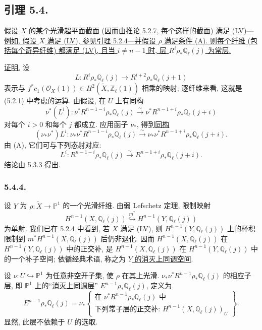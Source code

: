 \subsection*{引理 5.4.}
\underline{假设 $X$ 的某个光滑超平面截面 (因而由推论 5.2.7, 每个这样的截面) 满足 (LV)---例如, 假设 $X$ 满足 (LV), 参见引理 5.2.4---并假设 $\rho$ 满足条件 (A). 则每个纤维 (包括每个奇异纤维) 都满足 (LV), 且当 $i\neq n-1$ 时, 层 $R^i\rho_*\mathbb Q_\ell(j)$ 为常层.}

\underline{证明.}
设
\[
L:R^i\rho_*\mathbb Q_\ell(j)
\longrightarrow R^{i+2}\rho_*\mathbb Q_\ell(j+1)
\]
表示与 $f^*c_1(\mathcal O_X(1))\in H^2(\widetilde X,\mathbb Z_\ell(1))$ 相乘的映射; 逐纤维来看, 这就是 (5.2.1) 中考虑的运算. 由假设, 在 $U$ 上有同构
\begin{equation}\tag{5.4.1}
\nu^*(L^i):
\nu^*R^{n-1-i}\rho_*\mathbb Q_\ell(j)
\overset{\sim}{\longrightarrow}
\nu^*R^{n-1+i}\rho_*\mathbb Q_\ell(j+i)
\end{equation}
对每个 $i>0$ 和每个 $j$ 都成立. 应用函子 $\nu_*$, 得到\underline{同构}
\begin{equation}\tag{5.4.2}
(\nu_*\nu^*)L^i:
\nu_*\nu^*R^{n-1-i}\rho_*\mathbb Q_\ell(j)
\overset{\sim}{\longrightarrow}
\nu_*\nu^*R^{n-1+i}\rho_*\mathbb Q_\ell(j+i).
\end{equation}
由 (A), 它们可与下列态射对应:
\begin{equation}\tag{5.4.3}
L^i:R^{n-1-i}\rho_*\mathbb Q_\ell(j)
\overset{\sim}{\longrightarrow}
R^{n-1+i}\rho_*\mathbb Q_\ell(j+i).
\end{equation}
结论由 5.3.3 得出.

\subsubsection*{5.4.4.}
设 $Y$ 为 $\rho:\widetilde X\to\mathbb P^1$ 的一个光滑纤维. 由弱 Lefschetz 定理, 限制映射
\[
H^{n-1}(X,\mathbb Q_\ell(j))
\overset{m^*}{\hookrightarrow}
H^{n-1}(Y,\mathbb Q_\ell(j))
\]
为单射. 我们已在 5.2.4 中看到, 若 $X$ 满足 (LV), 则 $H^{n-1}(Y,\mathbb Q_\ell(j))$ 上的杯积限制到 $m^*H^{n-1}(X,\mathbb Q_\ell(j))$ 后仍非退化. 因而 $H^{n-1}(X,\mathbb Q_\ell(j))$ 在 $H^{n-1}(Y,\mathbb Q_\ell(j))$ 中的正交补, 是 $H^{n-1}(X,\mathbb Q_\ell(j))$ 在 $H^{n-1}(Y,\mathbb Q_\ell(j))$ 中的一个补子空间; 依循经典术语, 称之为 \underline{$Y$ 的消灭上同调空间}.

设 $\nu:U\hookrightarrow\mathbb P^1$ 为任意非空开子集, 使 $\rho$ 在其上光滑. $\nu_*\nu^*R^{n-1}\rho_*\mathbb Q_\ell(j)$ 的相应子层, 即 $\mathbb P^1$ 上的“\underline{消灭上同调层}” $E^{n-1}\rho_*\mathbb Q_\ell(j)$, 定义为
\begin{equation}\tag{5.4.4.1}
E^{n-1}\rho_*\mathbb Q_\ell(j)
=\nu_*\left\{
\begin{array}{l}
\text{在 }
\nu^*R^{n-1}\rho_*\mathbb Q_\ell(j)\text{ 中}\\[1ex]
\text{下列常子层的正交补: }H^{n-1}(X,\mathbb Q_\ell(j))_U
\end{array}
\right\}.
\end{equation}
显然, 此层不依赖于 $U$ 的选取.

